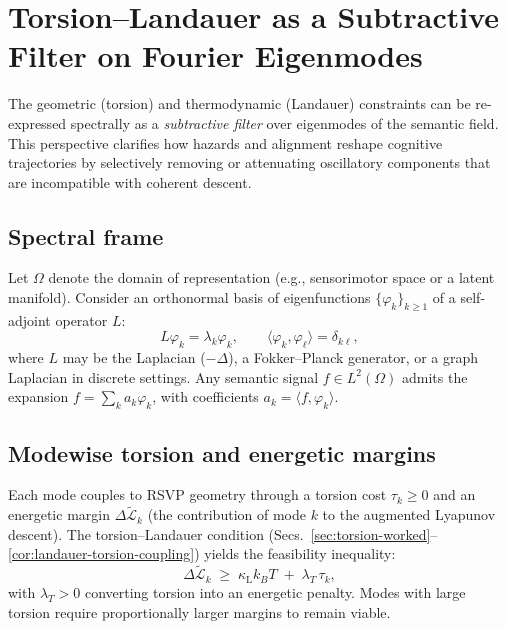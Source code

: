 \documentclass[a4paper,11pt]{article}
\begin{document}
\section{Torsion--Landauer as a Subtractive Filter on Fourier Eigenmodes}
\label{sec:spectral-filter}

The geometric (torsion) and thermodynamic (Landauer) constraints can be
re-expressed spectrally as a \emph{subtractive filter} over eigenmodes of the
semantic field. This perspective clarifies how hazards and alignment reshape
cognitive trajectories by selectively removing or attenuating oscillatory
components that are incompatible with coherent descent.

\subsection{Spectral frame}
Let $\Omega$ denote the domain of representation (e.g., sensorimotor space or a
latent manifold). Consider an orthonormal basis of eigenfunctions
$\{\varphi_k\}_{k\ge1}$ of a self-adjoint operator $L$:
\[
L\varphi_k=\lambda_k \varphi_k,\qquad
\langle \varphi_k,\varphi_\ell\rangle=\delta_{k\ell},
\]
where $L$ may be the Laplacian ($-\Delta$), a Fokker--Planck generator, or a
graph Laplacian in discrete settings. Any semantic signal $f\in L^2(\Omega)$
admits the expansion $f=\sum_k a_k \varphi_k$, with coefficients
$a_k=\langle f,\varphi_k\rangle$.

\subsection{Modewise torsion and energetic margins}
Each mode couples to RSVP geometry through a torsion cost $\tau_k\ge0$ and an
energetic margin $\Delta\widetilde{\mathcal{L}}_k$ (the contribution of mode $k$
to the augmented Lyapunov descent). The torsion--Landauer condition
(Secs.~\ref{sec:torsion-worked}--\ref{cor:landauer-torsion-coupling}) yields
the feasibility inequality:
\begin{equation}
\label{eq:mode-feasibility}
\Delta\widetilde{\mathcal{L}}_k \;\ge\; \kappa_{\mathrm L} k_B T \;+\; \lambda_T\,\tau_k,
\end{equation}
with $\lambda_T>0$ converting torsion into an energetic penalty. Modes with
large torsion require proportionally larger margins to remain viable.
\end{document}
